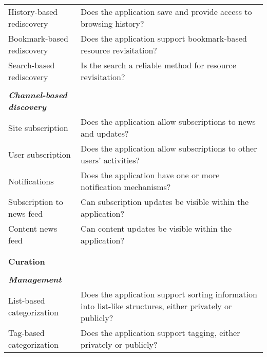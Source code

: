 {\begin{table*}[htbp]
\begin{tabular}{|p{0.28\linewidth}|p{0.72\linewidth}|}
History-based rediscovery    & Does the application save and provide access to browsing history?                                        \\
Bookmark-based rediscovery   & Does the application support bookmark-based resource revisitation?                                        \\
Search-based rediscovery     & Is the search a reliable method for resource revisitation?                             \\
&\\
\emph{\textbf{Channel-based discovery}}          &                                                                                                           \\
Site subscription            & Does the application allow subscriptions to news and updates?                                             \\
User subscription             & Does the application allow subscriptions to other users' activities?                                      \\
Notifications                & Does the application have one or more notification mechanisms?                                                      \\
Subscription to news feed                  & Can subscription updates be visible within the application?  \\
Content news feed                  & Can content updates be visible within the application? \\
&\\
\hline     
&\\                                        
\textbf{\large{Curation}}                     &                                                                                                        \\     
&\\  
\emph{\textbf{Management}}                    &                                                                                                           \\
List-based categorization               & Does the application support sorting information into list-like structures, either privately or publicly?                                                  \\
Tag-based categorization               & Does the application support tagging, either privately or publicly?                                                  \\

\end{tabular}
\end{table*}}
